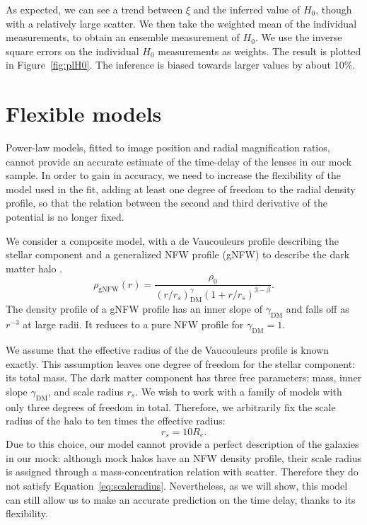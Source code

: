 \documentclass[usenatbib]{mnras}
\def\reff{R_e}
\def\gammadm{\gamma_{\mathrm{DM}}}
\def\Sref#1{Section~\ref{#1}\xspace}
\def\Fref#1{Figure~\ref{#1}\xspace}
\def\Eref#1{Equation~\ref{#1}\xspace}
\begin{document}
%
As expected, we can see a trend between $\xi$ and the inferred value of $H_0$, though with a relatively large scatter.
We then take the weighted mean of the individual measurements, to obtain an ensemble measurement of $H_0$. We use the inverse square errors on the individual $H_0$ measurements as weights.
The result is plotted in \Fref{fig:plH0}. The inference is biased towards larger values by about 10\%.

\section{Flexible models}

Power-law models, fitted to image position and radial magnification ratios, cannot provide an accurate estimate of the time-delay of the lenses in our mock sample.
In order to gain in accuracy, we need to increase the flexibility of the model used in the fit, adding at least one degree of freedom to the radial density profile, so that the relation between the second and third derivative of the potential is no longer fixed.

We consider a composite model, with a de Vaucouleurs profile describing the stellar component and a generalized NFW profile (gNFW) to describe the dark matter halo \citep{Zha96}.
\begin{equation}
\rho_{\mathrm{gNFW}}(r) = \frac{\rho_0}{(r/r_s)^\gammadm (1 + r/r_s)^{3 - \beta}}.
\end{equation}
The density profile of a gNFW profile has an inner slope of $\gammadm$ and falls off as $r^{-3}$ at large radii. It reduces to a pure NFW profile for $\gammadm=1$.

We assume that the effective radius of the de Vaucouleurs profile is known exactly.
This assumption leaves one degree of freedom for the stellar component: its total mass.
The dark matter component has three free parameters: mass, inner slope $\gammadm$, and scale radius $r_s$.
We wish to work with a family of models with only three degrees of freedom in total.
Therefore, we arbitrarily fix the scale radius of the halo to ten times the effective radius:
\begin{equation}\label{eq:scaleradius}
r_s = 10 \reff.
\end{equation}
Due to this choice, our model cannot provide a perfect description of the galaxies in our mock: although mock halos have an NFW density profile, their scale radius is assigned through a mass-concentration relation with scatter. Therefore they do not satisfy \Eref{eq:scaleradius}.
Nevertheless, as we will show, this model can still allow us to make an accurate prediction on the time delay, thanks to its flexibility.
\end{document}
